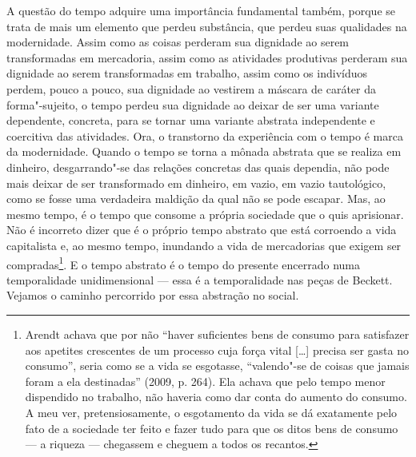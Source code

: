 A questão do tempo adquire uma importância fundamental também, porque se
trata de mais um elemento que perdeu substância, que perdeu suas
qualidades na modernidade. Assim como as coisas perderam sua dignidade
ao serem transformadas em mercadoria, assim como as atividades
produtivas perderam sua dignidade ao serem transformadas em trabalho,
assim como os indivíduos perdem, pouco a pouco, sua dignidade ao
vestirem a máscara de caráter da forma"-sujeito, o tempo perdeu sua
dignidade ao deixar de ser uma variante dependente, concreta, para se
tornar uma variante abstrata independente e coercitiva das atividades.
Ora, o transtorno da experiência com o tempo é marca da modernidade.
Quando o tempo se torna a mônada abstrata que se realiza em dinheiro,
desgarrando"-se das relações concretas das quais dependia, não pode mais
deixar de ser transformado em dinheiro, em vazio, em vazio tautológico,
como se fosse uma verdadeira maldição da qual não se pode escapar. Mas,
ao mesmo tempo, é o tempo que consome a própria sociedade que o quis
aprisionar. Não é incorreto dizer que é o próprio tempo abstrato que
está corroendo a vida capitalista e, ao mesmo tempo, inundando a vida de
mercadorias que exigem ser compradas\footnote{Arendt achava que por não
  ``haver suficientes bens de consumo para satisfazer aos apetites
  crescentes de um processo cuja força vital [\ldots{}] precisa ser gasta
  no consumo'', seria como se a vida se esgotasse, ``valendo"-se de
  coisas que jamais foram a ela destinadas'' (2009, p. 264). Ela achava
  que pelo tempo menor dispendido no trabalho, não haveria como dar
  conta do aumento do consumo. A meu ver, pretensiosamente, o esgotamento
  da vida se dá exatamente pelo fato de a sociedade ter feito e fazer
  tudo para que os ditos bens de consumo --- a riqueza --- chegassem e
  cheguem a todos os recantos.}. E o tempo abstrato é o tempo do
presente encerrado numa temporalidade unidimensional --- essa é a
temporalidade nas peças de Beckett. Vejamos o caminho percorrido por
essa abstração no social.

